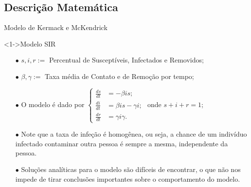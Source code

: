 \documentclass{beamer}
\begin{document}
\subsection{Descrição Matemática}
\begin{frame}{Modelo de Kermack e McKendrick}

    \begin{exampleblock}
        <1->{Modelo SIR}
        \begin{itemize}
            \item [$\bullet$] $s,i,r :=$ Percentual de Susceptíveis, Infectados e Removidos;
            \item [$\bullet$] $\beta, \gamma := $ Taxa média de Contato e de Remoção por tempo;
            \item [$\bullet$] O modelo é dado por
                $ 
                \begin{cases}
                    \frac{ds}{dt} &= -\beta i s; \\ 
                    \frac{di}{dt} &= \beta i s - \gamma i;  \\
                    \frac{dr}{dt} &= \gamma i \gamma. 
                \end{cases}
                $ 
                onde $s + i + r = 1$;
            \item [$\bullet$] Note que a taxa de infeção é homogênea, ou seja, a chance de um indivíduo
                infectado contaminar outra pessoa é sempre a mesma, independente da pessoa. 
            \item [$\bullet$] Soluções analíticas para o modelo são difíceis de encontrar, o que não 
                nos impede de tirar conclusões importantes sobre o comportamento do modelo.

        \end{itemize}

    \end{exampleblock} 
    
\end{frame}


\end{document}
